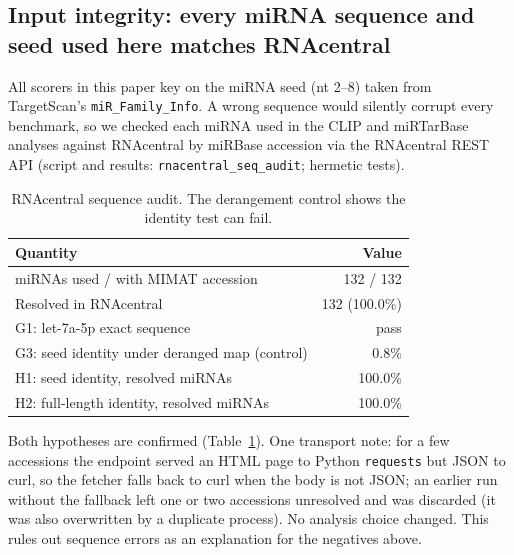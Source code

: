 \subsection{Input integrity: every miRNA sequence and seed used here matches RNAcentral}
All scorers in this paper key on the miRNA seed (nt 2--8) taken from TargetScan's \texttt{miR\_Family\_Info}. A wrong sequence would silently corrupt every benchmark, so we checked each miRNA used in the CLIP and miRTarBase analyses against RNAcentral by miRBase accession via the RNAcentral REST API (script and results: \texttt{rnacentral\_seq\_audit}; hermetic tests).
\begin{table}[h]\centering\small\begin{tabular}{lr}\hline Quantity & Value\\\hline
miRNAs used / with MIMAT accession & 132 / 132\\
Resolved in RNAcentral & 132 (100.0\%)\\
G1: let-7a-5p exact sequence & pass\\
G3: seed identity under deranged map (control) & 0.8\%\\
H1: seed identity, resolved miRNAs & 100.0\%\\
H2: full-length identity, resolved miRNAs & 100.0\%\\\hline\end{tabular}
\caption{RNAcentral sequence audit. The derangement control shows the identity test can fail.}\label{tab:rnacentral}\end{table}
Both hypotheses are confirmed (Table~\ref{tab:rnacentral}). One transport note: for a few accessions the endpoint served an HTML page to Python \texttt{requests} but JSON to curl, so the fetcher falls back to curl when the body is not JSON; an earlier run without the fallback left one or two accessions unresolved and was discarded (it was also overwritten by a duplicate process). No analysis choice changed. This rules out sequence errors as an explanation for the negatives above.
